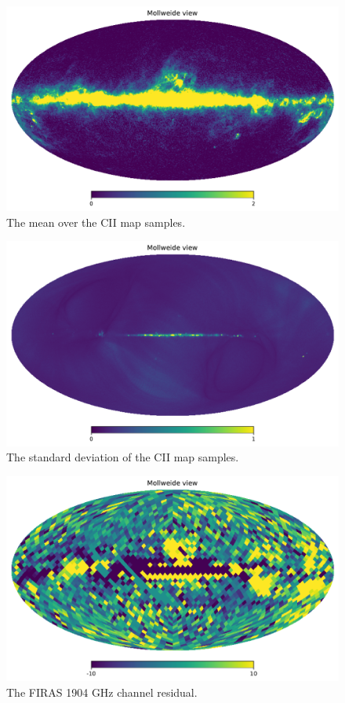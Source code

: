 \documentclass{aa}
\begin{document}
\begin{figure}
    \centering
    \includegraphics[width=\columnwidth]{figures/cii_meanmap.pdf}
    \caption{The mean over the CII map samples.}
    \label{fig:cii_mean}
\end{figure}

\begin{figure}
    \centering
    \includegraphics[width=\columnwidth]{figures/cii_stdmap.pdf}
    \caption{The standard deviation of the CII map samples.}
    \label{fig:cii_std}
\end{figure}

\begin{figure}
    \centering
    \includegraphics[width=\columnwidth]{figures/res_FIRAS_H1904_c0001_k000700.pdf}
    \caption{The FIRAS 1904 GHz channel residual.}
    \label{fig:firas_1904_res}
\end{figure}
\end{document}
